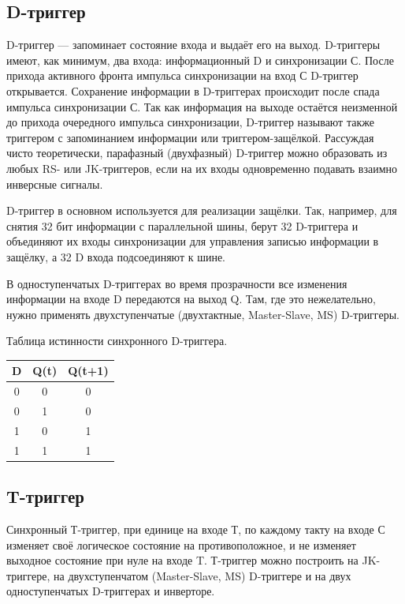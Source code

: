 \documentclass[unicode, 12pt, a4paper, oneside]{article}
\begin{document}
\subsection*{D-триггер}

D-триггер — запоминает состояние входа и выдаёт его на выход. D-триггеры имеют, как минимум, два входа: информационный D и синхронизации С. После прихода активного фронта импульса синхронизации на вход С D-триггер открывается. Сохранение информации в D-триггерах происходит после спада импульса синхронизации С. Так как информация на выходе остаётся неизменной до прихода очередного импульса синхронизации, D-триггер называют также триггером с запоминанием информации или триггером-защёлкой. Рассуждая чисто теоретически, парафазный (двухфазный) D-триггер можно образовать из любых RS- или JK-триггеров, если на их входы одновременно подавать взаимно инверсные сигналы.

D-триггер в основном используется для реализации защёлки. Так, например, для снятия 32 бит информации с параллельной шины, берут 32 D-триггера и объединяют их входы синхронизации для управления записью информации в защёлку, а 32 D входа подсоединяют к шине.

В одноступенчатых D-триггерах во время прозрачности все изменения информации на входе D передаются на выход Q. Там, где это нежелательно, нужно применять двухступенчатые (двухтактные, Master-Slave, MS) D-триггеры.

Таблица истинности синхронного D-триггера.

\begin{tabular}{|c|c|c|}
\hline	D	& Q(t)	& Q(t+1)	\\
\hline	0	& 0		& 0			\\
\hline	0	& 1		& 0			\\
\hline	1	& 0		& 1			\\
\hline	1	& 1		& 1			\\
\hline
\end{tabular}

\subsection*{T-триггер}

Синхронный Т-триггер, при единице на входе Т, по каждому такту на входе С изменяет своё логическое состояние на противоположное, и не изменяет выходное состояние при нуле на входе T. Т-триггер можно построить на JK-триггере, на двухступенчатом (Master-Slave, MS) D-триггере и на двух одноступенчатых D-триггерах и инверторе.
\end{document}
